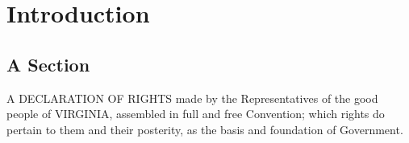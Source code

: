 

\chapter[Introduction]{Introduction}

\section{A Section}

A DECLARATION OF RIGHTS made by the Representatives of the good people of VIRGINIA, assembled in full and free
Convention; which rights do pertain to them and their posterity, as the basis and foundation of Government.

